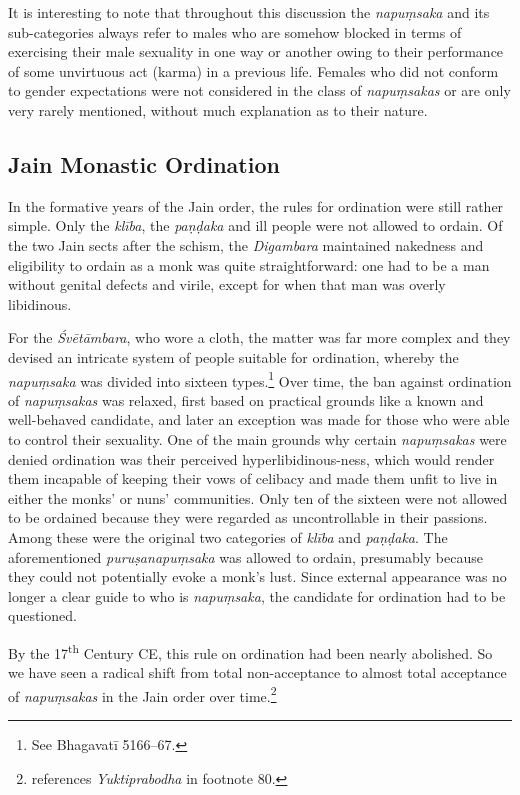 It is interesting to note that throughout this discussion the {\em napuṃsaka} and its sub-categories always refer to males who are somehow blocked in terms of exercising their male sexuality in one way or another owing to their performance of some unvirtuous act (karma) in a previous life. Females who did not conform to gender expectations were not considered in the class of {\em napuṃsakas} or are only very rarely mentioned, without much explanation as to their nature. 

\subsection{Jain Monastic Ordination}
In the formative years of the Jain order, the rules for ordination were still rather simple. Only the {\em klība}, the {\em paṇḍaka} and ill people were not allowed to ordain. Of the two Jain sects after the schism, the {\em Digambara} maintained nakedness and eligibility to ordain as a monk was quite straightforward: one had to be a man without genital defects and virile, except for when that man was overly libidinous. 

For the {\em Śvētāmbara}, who wore a cloth, the matter was far more complex and they devised an intricate system of people suitable for ordination, whereby the {\em napuṃsaka} was divided into sixteen types.\footnote{See Bhagavatī 5166–67.} Over time, the ban against ordination of {\em napuṃsakas} was relaxed, first based on practical grounds like a known and well-behaved candidate, and later an exception was made for those who were able to control their sexuality. One of the main grounds why certain {\em napuṃsakas} were denied ordination was their perceived hyperlibidinous-ness, which would render them incapable of keeping their vows of celibacy and made them unfit to live in either the monks' or nuns' communities. Only ten of the sixteen were not allowed to be ordained because they were regarded as uncontrollable in their passions. Among these were the original two categories of {\em klība} and {\em paṇḍaka}. The aforementioned {\em puruṣanapuṃsaka} was allowed to ordain, presumably because they could not potentially evoke a monk's lust. Since external appearance was no longer a clear guide to who is {\em napuṃsaka}, the candidate for ordination had to be questioned. 

By the 17\textsuperscript{th} Century CE, this rule on ordination had been nearly abolished. So we have seen a radical shift from total non-acceptance to almost total acceptance of {\em napuṃsakas} in the Jain order over time.\footnote{\cite{zwilling} references {\em Yuktiprabodha} in footnote 80.}

